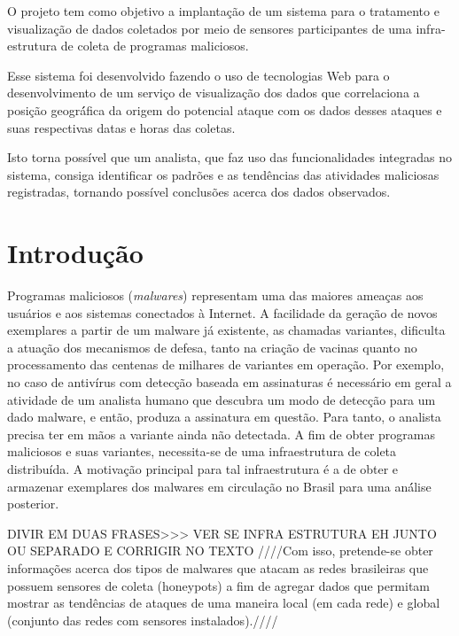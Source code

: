 \documentclass[%
        Portuguese,%
        ]
{ic-tese-v2}
\begin{document}
\author{Alexandre Or Cansian Baruque}


\beforepreface
\begin{oresumo}
O projeto tem como objetivo a implantação de um sistema para o tratamento e visualização de dados coletados por meio de sensores participantes de uma infra-estrutura de coleta de programas maliciosos.

Esse sistema foi desenvolvido fazendo o uso de tecnologias Web para o desenvolvimento de um serviço de visualização dos dados que correlaciona a posição geográ́fica da origem do potencial ataque com os dados desses ataques e suas respectivas datas e horas das coletas.

Isto torna possível que um analista, que faz uso das funcionalidades integradas no sistema, consiga identificar os padrões e as tendências das atividades maliciosas registradas, tornando possível conclusões acerca dos dados observados.
\end{oresumo}
\afterpreface	


\chapter{Introdução}
Programas maliciosos (\emph{malwares}) representam uma das maiores ameaças aos usuários e aos sistemas conectados à Internet. A facilidade da geração de novos exemplares a partir de um malware já existente, as chamadas variantes, dificulta a atuação dos mecanismos de defesa, tanto na criação de vacinas quanto no processamento das centenas de milhares de variantes em operação. Por exemplo, no caso de antivírus com detecção baseada em assinaturas é necessário em geral a atividade de um analista humano que descubra um modo de detecção para um dado malware, e  então, produza a assinatura em questão. Para tanto, o analista precisa ter em mãos a variante ainda não detectada.
A fim de obter programas maliciosos e suas variantes, necessita-se de uma infraestrutura de coleta distribuída. A motivação principal para tal infraestrutura é a de obter e armazenar exemplares dos malwares em circulação no Brasil para uma aná́lise posterior. 

DIVIR EM DUAS FRASES>>> VER SE INFRA ESTRUTURA EH JUNTO OU SEPARADO E CORRIGIR NO TEXTO
////Com isso, pretende-se obter informações acerca dos tipos de malwares que
atacam as redes brasileiras que possuem sensores de coleta (honeypots) a fim de agregar dados que permitam mostrar as tendências de ataques de uma maneira local (em cada rede) e global (conjunto das redes com sensores instalados).////
\end{document}
